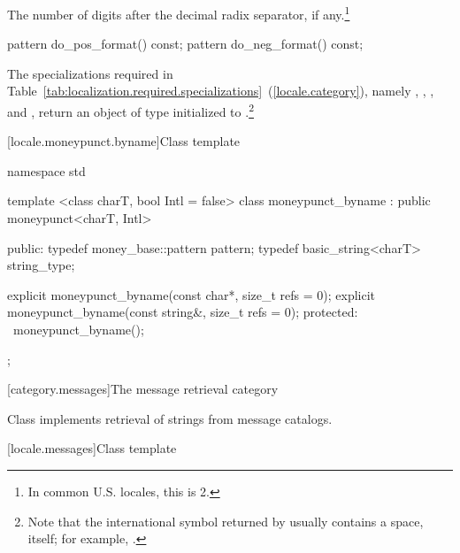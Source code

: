 \begin{itemdescr}
\pnum
\returns
The number of digits after the decimal radix separator, if any.\footnote{In
common U.S. locales, this is 2.}
\end{itemdescr}

%
%
%
%
\begin{itemdecl}
pattern do_pos_format() const;
pattern do_neg_format() const;
\end{itemdecl}

\begin{itemdescr}
\pnum
\returns
The specializations required in Table~\ref{tab:localization.required.specializations}~(\ref{locale.category}), namely
,
,
,
and
,
return an object of type
initialized to
.\footnote{Note that the international
symbol returned by
usually contains a space, itself;
for example, .}
\end{itemdescr}

[locale.moneypunct.byname]{Class template }

%
\begin{codeblock}
namespace std {
  template <class charT, bool Intl = false>
  class moneypunct_byname : public moneypunct<charT, Intl> {
  public:
    typedef money_base::pattern pattern;
    typedef basic_string<charT> string_type;

    explicit moneypunct_byname(const char*, size_t refs = 0);
    explicit moneypunct_byname(const string&, size_t refs = 0);
  protected:
    ~moneypunct_byname();
  };
}
\end{codeblock}

[category.messages]{The message retrieval category}

\pnum
Class
implements retrieval of strings from message catalogs.

[locale.messages]{Class template }

